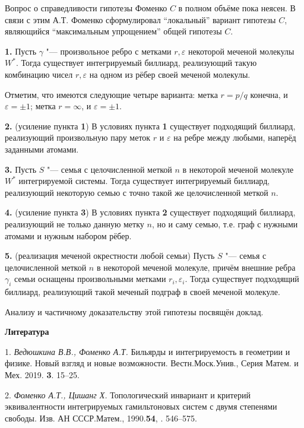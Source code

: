  Вопрос о справедливости гипотезы Фоменко $C$ в полном объёме пока неясен. В связи с этим А.Т. Фоменко сформулировал ``локальный'' вариант гипотезы $C$, являющийся ``максимальным упрощением'' общей гипотезы $C$.

\textbf{1.} Пусть $\gamma$ "--- произвольное ребро с метками $r, \varepsilon$ некоторой меченой молекулы $W^{*}$. Тогда существует интегрируемый биллиард, реализующий такую комбинацию чисел $r, \varepsilon$ на одном из рёбер своей меченой молекулы.

Отметим, что имеются следующие четыре варианта: метка $r = p \slash q$ конечна, и $\varepsilon = \pm 1$; метка $r = \infty$, и $\varepsilon = \pm 1$.

\textbf{2. } (усиление пункта \textbf{1}) В условиях пункта \textbf{1} существует подходящий биллиард, реализующий произвольную пару меток $r$ и $\varepsilon$ на ребре между любыми, наперёд заданными атомами.

\textbf{3.} Пусть $S$ "--- семья с целочисленной меткой $n$ в некоторой меченой молекуле $W^{*}$ интегрируемой системы. Тогда существует интегрируемый биллиард, реализующий некоторую семью с точно такой же целочисленной меткой $n$.

\textbf{4. } (усиление пункта \textbf{3}) В условиях пункта \textbf{2} существует подходящий биллиард, реализующий не только данную метку $n$, но и саму семью, т.е. граф с нужными атомами и нужным набором рёбер.

\textbf{5. } (реализация меченой окрестности любой семьи) Пусть $S$ "--- семья с целочисленной меткой $n$ в некоторой меченой молекуле, причём внешние ребра $\gamma_i$ семьи оснащены произвольными метками $r_i, \varepsilon_i$. Тогда существует подходящий биллиард, реализующий такой меченый подграф в своей меченой молекуле.


Анализу и частичному доказательству этой гипотезы посвящён доклад.




\smallskip \centerline {\bf Литература} \nopagebreak

1. {\it Ведюшкина В.В., Фоменко А.Т.} Бильярды и интегрируемость в геометрии и физике. Новый взгляд и новые возможности. Вестн.Моск.Унив., Серия Матем. и Мех. 2019. \textbf{3}. 15--25.

2. {\it Фоменко А.Т., Цишанг Х.} Топологический инвариант и критерий
эквивалентности интегрируемых гамильтоновых систем с двумя степенями
свободы. Изв. АН СССР.Матем.,
1990.\textbf{54}, .
 546--575.
